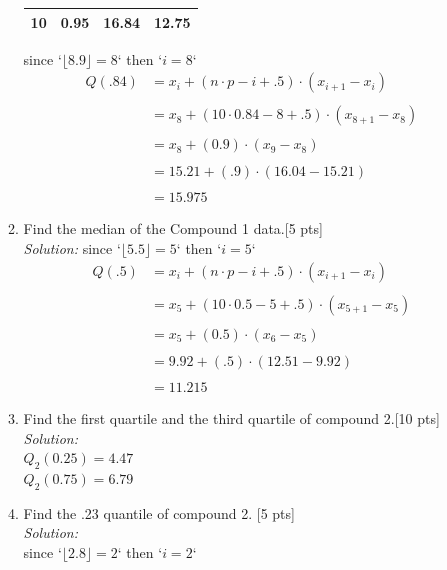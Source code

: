 \documentclass[11pt]{article}\usepackage[]{graphicx}\usepackage[]{color}
\begin{document}
\begin{enumerate}
\begin{enumerate}
\begin{table}[h!]
\begin{tabular}{|l|p{2cm}|p{3cm}|p{3cm}|}
      10  &  0.95 & 16.84 & 12.75 \\
      \hline
     \end{tabular}
  \end{table}
  since `\(\lfloor 8.9 \rfloor = 8 \)` then `\(i = 8\)` 
     \begin{align*}
       Q(.84) &= x_i + (n \cdot p - i + .5) \cdot \left( x_{i+1} - x_i \right)  \\\\
             &= x_8 + (10 \cdot 0.84 - 8 + .5) \cdot \left( x_{8+1} - x_8 \right)  \\\\
             &= x_8 + (0.9) \cdot \left( x_{9} - x_8 \right)  \\\\
             &= 15.21 + (.9) \cdot \left( 16.04 - 15.21 \right)  \\\\
             &= 15.975
  \end{align*}
    \item Find the median of the Compound 1 data.[5 pts]\\
    \emph{Solution:} 
      since `\(\lfloor 5.5 \rfloor = 5 \)` then `\(i = 5\)` 
     \begin{align*}
       Q(.5) &= x_i + (n \cdot p - i + .5) \cdot \left( x_{i+1} - x_i \right)  \\\\
             &= x_5 + (10 \cdot 0.5 - 5 + .5) \cdot \left( x_{5+1} - x_5 \right)  \\\\
             &= x_5 + (0.5) \cdot \left( x_{6} - x_5 \right)  \\\\
             &= 9.92 + (.5) \cdot \left( 12.51 - 9.92 \right)  \\\\
             &= 11.215
  \end{align*}
    \item Find the first quartile and the third quartile of compound 2.[10 pts]\\
    \emph{Solution:} \\
    $Q_2(0.25)= 4.47$\\
    $Q_2(0.75)= 6.79$
    \item Find the .23 quantile of compound 2. [5 pts]\\
    \emph{Solution:} \\
          since `\(\lfloor 2.8 \rfloor = 2 \)` then `\(i = 2\)` 
     \begin{align*}

\end{align*}
\end{enumerate}
\end{enumerate}
\end{document}
